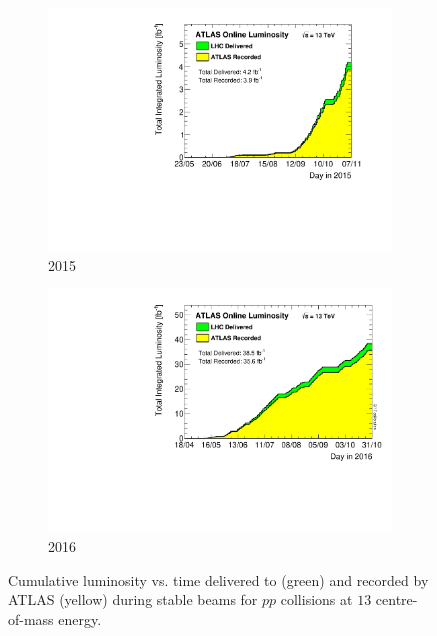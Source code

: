 \begin{figure}[h!]
\centering
\captionsetup{justification=centering}
	\hspace{-2cm}
    \begin{subfigure}[b]{0.35\textwidth}
        \includegraphics[width=\textwidth,angle=-90]{figures/detector/Lumi_2015}
        \caption{2015}
        \label{fig:Lumi_2015}
    \end{subfigure}
    \quad
    \quad
    \quad
    \quad
    \begin{subfigure}[b]{0.35\textwidth}
        \includegraphics[width=\textwidth,angle=-90]{figures/detector/Lumi_2016}
        \caption{2016}
        \label{fig:Lumi_2016}
    \end{subfigure}
\caption{Cumulative luminosity vs. time delivered to (green) and recorded by ATLAS (yellow) during stable beams for $pp$ collisions at $13$ \TeV centre-of-mass energy.}
\label{fig:Lumi}
\end{figure}







